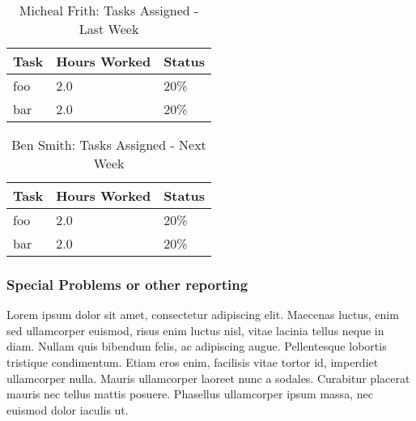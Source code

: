 \documentclass[12pt,journal,compsoc]{IEEEtran}
\begin{document}
\begin{table}[ht]
\renewcommand{\arraystretch}{1.3}
	\caption{Micheal Frith: Tasks Assigned - Last Week}
	
	\label{Summary of Ben Smith's activities: last week}
	
	\centering
	
	\begin{tabular}{p{5.5cm}|p{1cm}|p{1cm}}

	\hline
	\bfseries 	Task		 		& \bfseries Hours Worked	& \bfseries Status	\\
	\hline
	\hline
				foo					& 2.0						& 20\%				\\	%
				bar					& 2.0						& 20\%				\\	
	\hline
	\end{tabular}
\end{table}

\begin{table}[ht]
\renewcommand{\arraystretch}{1.3}
	\caption{Ben Smith: Tasks Assigned - Next Week}
	
	\label{Summary of Ben Smith's activites: this week}
	
	\centering
	
	\begin{tabular}{p{5.5cm}|p{1cm}|p{1cm}}

	\hline
	\bfseries 	Task		 		& \bfseries Hours Worked	& \bfseries Status	\\
	\hline
	\hline
				foo					& 2.0						& 20\%				\\	%
				bar					& 2.0						& 20\%				\\	
	\hline
	\end{tabular}
\end{table}

\subsubsection*{Special Problems or other reporting}
Lorem ipsum dolor sit amet, consectetur adipiscing elit. Maecenas luctus, enim sed ullamcorper euismod, risus enim luctus nisl, vitae lacinia tellus neque in diam. Nullam quis bibendum felis, ac adipiscing augue. Pellentesque lobortis tristique condimentum. Etiam eros enim, facilisis vitae tortor id, imperdiet ullamcorper nulla. Mauris ullamcorper laoreet nunc a sodales. Curabitur placerat mauris nec tellus mattis posuere. Phasellus ullamcorper ipsum massa, nec euismod dolor iaculis ut.
\end{document}
